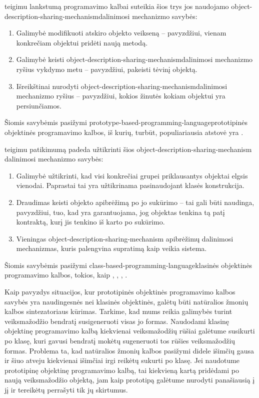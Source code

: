 \cite{Lieberman:1987:TO:62139.62144} teigimu lankstumą programavimo
kalbai suteikia šios trys jos naudojamo
\gls{object-description-sharing-mechanism}{dalinimosi mechanizmo}
savybės:
\begin{enumerate}
  \item Galimybė modifikuoti atskiro objekto veikseną – pavyzdžiui,
    vienam konkrečiam objektui pridėti naują metodą.
  \item Galimybė keisti
    \gls{object-description-sharing-mechanism}{dalinimosi
    mechanizmo} ryšius vykdymo metu – pavyzdžiui, pakeisti tėvinį
    objektą.
  \item Išreikštinai nurodyti
    \gls{object-description-sharing-mechanism}{dalinimosi mechanizmo}
    ryšius – pavyzdžiui, kokios žinutės kokiam objektui yra
    persiunčiamos.
\end{enumerate}
Šiomis savybėmis pasižymi
\gls{prototype-based-programming-language}{prototipinės objektinės
programavimo kalbos}, iš kurių, turbūt, populiariausia atstovė yra
.

\cite{Lieberman:1987:TO:62139.62144} teigimu patikimumą padeda
užtikrinti šios \gls{object-description-sharing-mechanism}{
dalinimosi mechanizmo} savybės:
\begin{enumerate}
  \item Galimybė užtikrinti, kad visi konkrečiai grupei priklausantys
    objektai elgsis vienodai. Paprastai tai yra užtikrinama
    pasinaudojant klasės konstrukcija.
  \item Draudimas keisti objekto apibrėžimą po jo sukūrimo – tai
    gali būti naudinga, pavyzdžiui, tuo, kad yra garantuojama,
    jog objektas tenkina tą patį kontraktą, kurį jis tenkino iš
    karto po sukūrimo.
  \item Vieningas \gls{object-description-sharing-mechanism}{
    apibrėžimų dalinimosi mechanizmas}, kuris palengvina supratimą
    kaip veikia sistema.
\end{enumerate}
Šiomis savybėmis pasižymi
\gls{class-based-programming-language}{klasinės objektinės
programavimo kalbos}, tokios, kaip , ,
, .

Kaip pavyzdys situacijos, kur prototipinės objektinės programavimo
kalbos savybės yra naudingesnės nei klasinės objektinės, galėtų
būti natūralios žmonių kalbos sintezatoriaus kūrimas. Tarkime, kad
mums reikia galimybės turint veiksmažodžio bendratį susigeneruoti
visas jo formas. Naudodami klasinę objektinę programavimo kalbą
kiekvienai veiksmažodžių rūšiai galėtume susikurti po klasę,
kuri gavusi bendratį mokėtų sugeneruoti tos rūšies veiksmažodžių
formas. Problema ta, kad natūralios žmonių kalbos pasižymi didele
išimčių gausa ir šiuo atveju kiekvienai išimčiai irgi reikėtų
sukurti po klasę. Jei naudotume prototipinę objektinę programavimo
kalbą, tai kiekvieną kartą pridėdami po naują veiksmažodžio
objektą, jam kaip prototipą galėtume nurodyti panašiausią į jį ir
tereikėtų perrašyti tik jų skirtumus.

